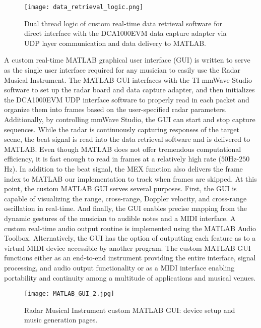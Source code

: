 \documentclass[10pt,journal,final]{IEEEtran}
\begin{document}
\begin{figure}[h]
	\centering
	\texttt{[image: data\_retrieval\_logic.png]}
	\caption{Dual thread logic of custom real-time data retrieval software for direct interface with the DCA1000EVM data capture adapter via UDP layer communication and data delivery to MATLAB.}
	\label{fig:data_retrieval}
\end{figure} 

A custom real-time MATLAB graphical user interface (GUI) is written to serve as the single user interface required for any musician to easily use the Radar Musical Instrument. The MATLAB GUI interfaces with the TI mmWave Studio software \cite{TI:mmWave_Studio} to set up the radar board and data capture adapter, and then initializes the DCA1000EVM UDP interface software to properly read in each packet and organize them into frames based on the user-specified radar parameters. Additionally, by controlling mmWave Studio, the GUI can start and stop capture sequences. While the radar is continuously capturing responses of the target scene, the beat signal is read into the data retrieval software and is delivered to MATLAB. Even though MATLAB does not offer tremendous computational efficiency, it is fast enough to read in frames at a relatively high rate ($50$Hz-$250$Hz). In addition to the beat signal, the MEX function also delivers the frame index to MATLAB our implementation to track when frames are skipped. At this point, the custom MATLAB GUI serves several purposes. First, the GUI is capable of visualizing the range, cross-range, Doppler velocity, and cross-range oscillation in real-time. And finally, the GUI enables precise mapping from the dynamic gestures of the musician to audible notes and a MIDI interface. A custom real-time audio output routine is implemented using the MATLAB Audio Toolbox. Alternatively, the GUI has the option of outputting each feature as to a virtual MIDI device accessible by another program. The custom MATLAB GUI functions either as an end-to-end instrument providing the entire interface, signal processing, and audio output functionality or as a MIDI interface enabling portability and continuity among a multitude of applications and musical venues.

\begin{figure}[h]
	\centering
	\texttt{[image: MATLAB\_GUI\_2.jpg]}
	\caption{Radar Musical Instrument custom MATLAB GUI: device setup and music generation pages.}
	\label{fig:matlab_gui}
\end{figure}
\end{document}
